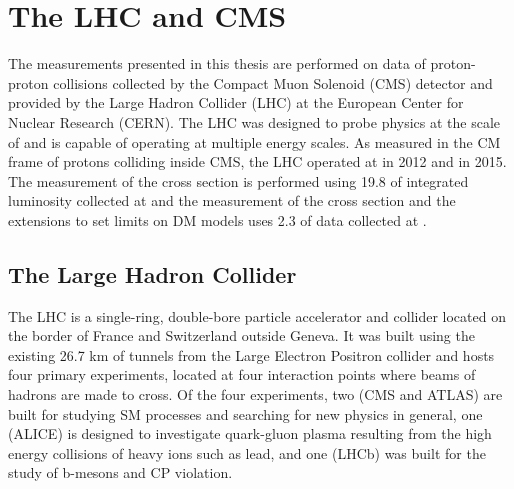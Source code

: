 
\chapter{The LHC and CMS}\label{sec:experiment}

The measurements presented in this thesis are performed
 on data of proton-proton collisions collected %
 by the Compact Muon Solenoid (CMS) detector and
 provided by the
 Large Hadron Collider (LHC) at the 
 European Center for Nuclear Research (CERN).
The LHC was designed to probe physics at the 
 scale of \TeV and is capable of operating at
 multiple energy scales.
As measured in the CM frame
 of protons colliding inside CMS,
 the LHC operated at
  \TeV in 2012 and  \TeV in 2015.
The measurement of the \ppwbb cross section 
 is performed using 19.8 \fbinv of integrated luminosity
 collected at  \TeV and 
 the measurement of the \ppzgnng cross section
 and the extensions to set limits on DM models 
 uses 2.3 \fbinv of data collected at  \TeV. 

\section{The Large Hadron Collider}
The LHC is a single-ring, double-bore 
 particle accelerator and collider located 
 on the border of France and Switzerland outside Geneva.
It was built using the existing 26.7 km of tunnels from the
 Large Electron Positron collider and hosts
 four primary experiments, located at four
 interaction points where beams of hadrons are made to cross.
Of the four experiments, two (CMS and ATLAS) are built for 
 studying SM processes and searching for new physics in general,
 one (ALICE) is designed to investigate 
 quark-gluon plasma resulting from 
 the high energy collisions of heavy ions such as lead,
 and one (LHCb) was built for the study of
 b-mesons and CP violation.


